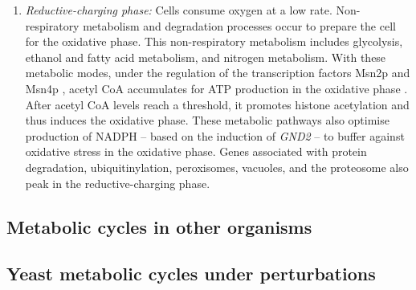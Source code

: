 \begin{enumerate}
\item \emph{Reductive-charging phase:} Cells consume oxygen at a low rate.
  Non-respiratory metabolism and degradation processes occur to prepare the cell for the oxidative phase.
  This non-respiratory metabolism includes glycolysis, ethanol and fatty acid metabolism, and nitrogen metabolism.
  With these metabolic modes, under the regulation of the transcription factors Msn2p and Msn4p \citep{kuangMsn2RegulateExpression2017}, acetyl CoA accumulates for ATP production in the oxidative phase \citep{tuLogicYeastMetabolic2005}.
After acetyl CoA levels reach a threshold, it promotes histone acetylation and thus induces the oxidative phase.
These metabolic pathways also optimise production of NADPH -- based on the induction of \emph{GND2} -- to buffer against oxidative stress in the oxidative phase.
Genes associated with protein degradation, ubiquitinylation, peroxisomes, vacuoles, and the proteosome also peak in the reductive-charging phase.
\end{enumerate}




\subsection{Metabolic cycles in other organisms}
\label{subsec:intro-ymc-other_organisms}

\subsection{Yeast metabolic cycles under perturbations}
\label{subsec:intro-ymc-perturbations}


